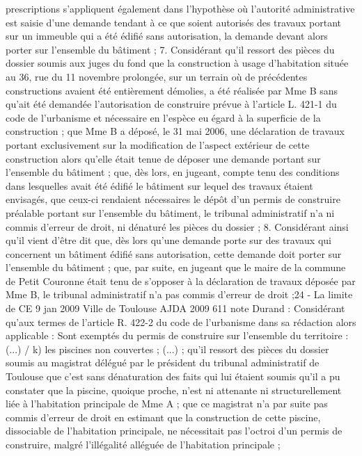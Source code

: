 \documentclass[11pt,a4paper]{report}
\begin{document}
	prescriptions s'appliquent également dans l'hypothèse où l'autorité administrative est saisie d'une demande
	tendant à ce que soient autorisés des travaux portant sur un immeuble qui a été édifié sans autorisation, la
	demande devant alors porter sur l'ensemble du bâtiment ;
	7. Considérant qu'il ressort des pièces du dossier soumis aux juges du fond que la construction à usage
	d'habitation située au 36, rue du 11 novembre prolongée, sur un terrain où de précédentes constructions avaient
	été entièrement démolies, a été réalisée par Mme B sans qu'ait été demandée l'autorisation de construire prévue
	à l'article L. 421-1 du code de l'urbanisme et nécessaire en l'espèce eu égard à la superficie de la construction ;
	que Mme B a déposé, le 31 mai 2006, une déclaration de travaux portant exclusivement sur la modification de
	l'aspect extérieur de cette construction alors qu'elle était tenue de déposer une demande portant sur l'ensemble
	du bâtiment ; que, dès lors, en jugeant, compte tenu des conditions dans lesquelles avait été édifié le bâtiment
	sur lequel des travaux étaient envisagés, que ceux-ci rendaient nécessaires le dépôt d'un permis de construire
	préalable portant sur l'ensemble du bâtiment, le tribunal administratif n'a ni commis d'erreur de droit, ni
	dénaturé les pièces du dossier ;
	8. Considérant ainsi qu'il vient d'être dit que, dès lors qu'une demande porte sur des travaux qui concernent un
	bâtiment édifié sans autorisation, cette demande doit porter sur l'ensemble du bâtiment ; que, par suite, en
	jugeant que le maire de la commune de Petit Couronne était tenu de s'opposer à la déclaration de travaux
	déposée par Mme B, le tribunal administratif n'a pas commis d'erreur de droit ;24
	- La limite de CE 9 jan 2009 Ville de Toulouse AJDA 2009 611 note Durand : Considérant qu'aux termes de
	l'article R. 422-2 du code de l'urbanisme dans sa rédaction alors applicable : Sont exemptés du permis de
	construire sur l'ensemble du territoire : (...) / k) les piscines non couvertes ; (...) ; qu'il ressort des pièces du
	dossier soumis au magistrat délégué par le président du tribunal administratif de Toulouse que c'est sans
	dénaturation des faits qui lui étaient soumis qu'il a pu constater que la piscine, quoique proche, n'est ni
	attenante ni structurellement liée à l'habitation principale de Mme A ; que ce magistrat n'a par suite pas commis
	d'erreur de droit en estimant que la construction de cette piscine, dissociable de l'habitation principale, ne
	nécessitait pas l'octroi d'un permis de construire, malgré l'illégalité alléguée de l'habitation principale ;
\end{document}
